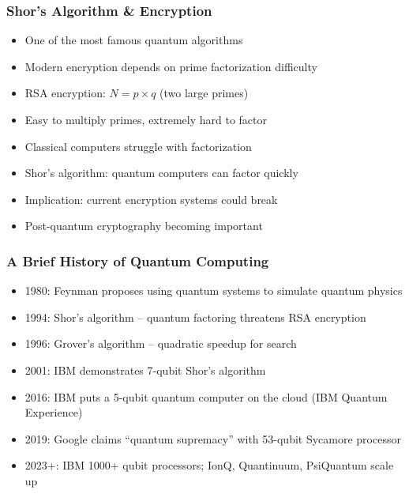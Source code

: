 \begin{frame}[fragile]\frametitle{Shor's Algorithm \& Encryption}
\begin{itemize}
\item One of the most famous quantum algorithms
\item Modern encryption depends on prime factorization difficulty
\item RSA encryption: $N = p \times q$ (two large primes)
\item Easy to multiply primes, extremely hard to factor
\item Classical computers struggle with factorization
\item Shor's algorithm: quantum computers can factor quickly
\item Implication: current encryption systems could break
\item Post-quantum cryptography becoming important
\end{itemize}
\end{frame}

\begin{frame}[fragile]\frametitle{A Brief History of Quantum Computing}
\begin{itemize}
\item 1980: Feynman proposes using quantum systems to simulate quantum physics
\item 1994: Shor's algorithm -- quantum factoring threatens RSA encryption
\item 1996: Grover's algorithm -- quadratic speedup for search
\item 2001: IBM demonstrates 7-qubit Shor's algorithm
\item 2016: IBM puts a 5-qubit quantum computer on the cloud (IBM Quantum Experience)
\item 2019: Google claims ``quantum supremacy'' with 53-qubit Sycamore processor
\item 2023+: IBM 1000+ qubit processors; IonQ, Quantinuum, PsiQuantum scale up
\end{itemize}
\end{frame}

